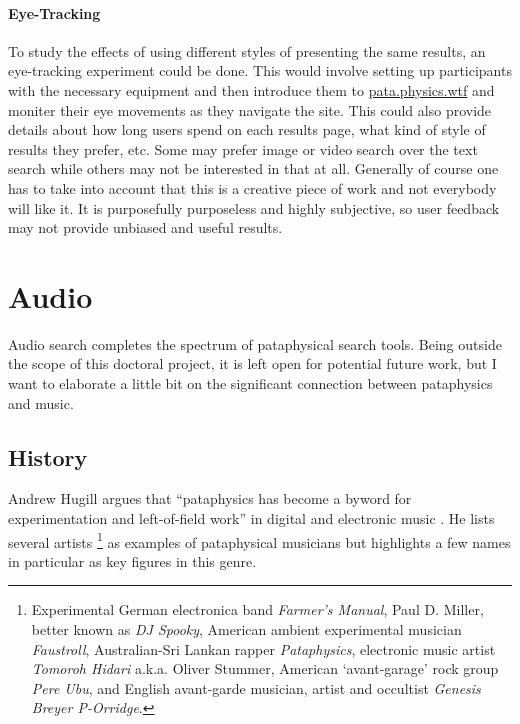 \paragraph{Eye-Tracking}
To study the effects of using different styles of presenting the same results, an eye-tracking experiment could be done. This would involve setting up participants with the necessary equipment and then introduce them to \url{pata.physics.wtf} and moniter their eye movements as they navigate the site. This could also provide details about how long users spend on each results page, what kind of style of results they prefer, etc. Some may prefer image or video search over the text search while others may not be interested in that at all. Generally of course one has to take into account that this is a creative piece of work and not everybody will like it. It is purposefully purposeless and highly subjective, so user feedback may not provide unbiased and useful results.


\section{Audio}
\label{s:audio}

Audio search completes the spectrum of pataphysical search tools. Being outside the scope of this doctoral project, it is left open for potential future work, but I want to elaborate a little bit on the significant connection between pataphysics and music.


\subsection{History}
\label{s:history}

Andrew Hugill argues that ``pataphysics has become a byword for experimentation and left-of-field work'' in digital and electronic music \autocite*{Hugill2012}. He lists several artists \footnote{Experimental German electronica band \textit{Farmer’s Manual}, Paul D. Miller, better known as \textit{DJ Spooky}, American ambient experimental musician \textit{Faustroll}, Australian-Sri Lankan rapper \textit{Pataphysics}, electronic music artist \textit{Tomoroh Hidari} a.k.a. Oliver Stummer, American `avant-garage' rock group \textit{Pere Ubu}, and English avant-garde musician, artist and occultist \textit{Genesis Breyer P-Orridge}.} as examples of pataphysical musicians but highlights a few names in particular as key figures in this genre. 

